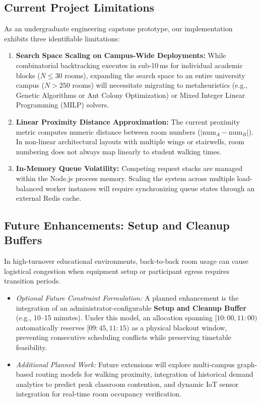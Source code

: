 \documentclass[conference]{IEEEtran}
\begin{document}
\subsection{Current Project Limitations}
As an undergraduate engineering capstone prototype, our implementation exhibits three identifiable limitations:
\begin{enumerate}
    \item \textbf{Search Space Scaling on Campus-Wide Deployments:} While combinatorial backtracking executes in sub-10\,ms for individual academic blocks ($N \le 30$ rooms), expanding the search space to an entire university campus ($N > 250$ rooms) will necessitate migrating to metaheuristics (e.g., Genetic Algorithms or Ant Colony Optimization) or Mixed Integer Linear Programming (MILP) solvers.
    \item \textbf{Linear Proximity Distance Approximation:} The current proximity metric computes numeric distance between room numbers ($|\text{num}_A - \text{num}_B|$). In non-linear architectural layouts with multiple wings or stairwells, room numbering does not always map linearly to student walking times.
    \item \textbf{In-Memory Queue Volatility:} Competing request stacks are managed within the Node.js process memory. Scaling the system across multiple load-balanced worker instances will require synchronizing queue states through an external Redis cache.
\end{enumerate}

\subsection{Future Enhancements: Setup and Cleanup Buffers}
In high-turnover educational environments, back-to-back room usage can cause logistical congestion when equipment setup or participant egress requires transition periods. 
\begin{itemize}
    \item \textit{Optional Future Constraint Formulation:} A planned enhancement is the integration of an administrator-configurable \textbf{Setup and Cleanup Buffer} (e.g., 10--15 minutes). Under this model, an allocation spanning $[10:00, 11:00)$ automatically reserves $[09:45, 11:15)$ as a physical blackout window, preventing consecutive scheduling conflicts while preserving timetable feasibility.
    \item \textit{Additional Planned Work:} Future extensions will explore multi-campus graph-based routing models for walking proximity, integration of historical demand analytics to predict peak classroom contention, and dynamic IoT sensor integration for real-time room occupancy verification.
\end{itemize}
\end{document}
